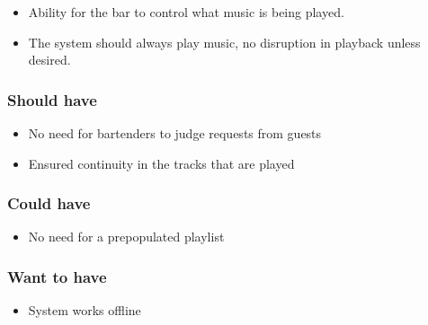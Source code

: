 \begin{itemize}
        \item Ability for the bar to control what music is being played.
        \item The system should always play music, no disruption in playback unless desired.
\end{itemize}

\subsubsection{Should have}

\begin{itemize}
        \item No need for bartenders to judge requests from guests
        \item Ensured continuity in the tracks that are played
\end{itemize}

\subsubsection{Could have}

\begin{itemize}
        \item No need for a prepopulated playlist
\end{itemize}

\subsubsection{Want to have}

\begin{itemize}
        \item System works offline
\end{itemize}
